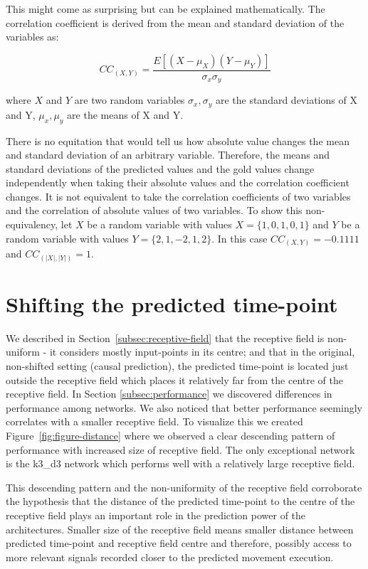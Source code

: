 This might come as surprising but can be explained mathematically. The correlation coefficient is derived from the mean and standard deviation of the variables as:

\begin{equation}
    CC_{(X, Y)}= \frac{E[(X - \mu_X)(Y - \mu_Y)] }{\sigma_x \sigma_y}
    \label{eq:correlation}
\end{equation}

where $X$ and $Y$ are two random variables $\sigma_x, \sigma_y$ are the standard deviations of X and Y, $ \mu_x, \mu_y$ are the means of X and Y.

There is no equitation that would tell us how absolute value changes the mean and standard deviation of an arbitrary variable. Therefore, the means and standard deviations of the predicted values and the gold values change independently when taking their absolute values and the correlation coefficient changes.
It is not equivalent to take the correlation coefficients of two variables and the correlation of absolute values of two variables. 
To show this non-equivalency, let $X$ be a random variable with values $X = \{1, 0, 1, 0, 1\} $ and $Y$ be a random variable with values $Y = \{2, 1, -2, 1, 2\}$. In this case $CC_{(X,Y)} = -0.1111$ and $CC_{(|X|,|Y|)} = 1$.


\section{Shifting the predicted time-point}\label{sec:shifting-the-predicted-time-point}
We described in Section~\ref{subsec:receptive-field} that the receptive field is non-uniform - it considers mostly input-points in its centre; and that in the original, non-shifted setting (causal prediction), the predicted time-point is located just outside the receptive field which places it relatively far from the centre of the receptive field. 
In Section \ref{subsec:performance} we discovered differences in performance among networks. We also noticed that better performance seemingly correlates with a smaller receptive field. To visualize this we created Figure~\ref{fig:figure-distance} where we observed a clear descending pattern of performance with increased size of receptive field. The only exceptional network is the k3\_d3 network which performs well with a relatively large receptive field. 

This descending pattern and the non-uniformity of the receptive field corroborate the hypothesis that the distance of the predicted time-point to the centre of the receptive field plays an important role in the prediction power of the architectures.
Smaller size of the receptive field means smaller distance between predicted time-point and receptive field centre and therefore, possibly access to more relevant signals recorded closer to the predicted movement execution.

